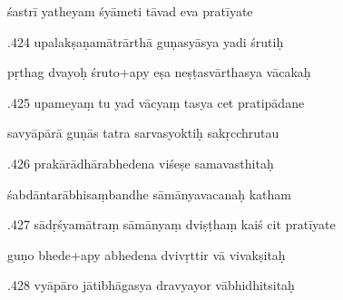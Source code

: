 \documentclass[article,12pt,a4paper]{memoir}%
\newcounter{parCount}
\begin{document}
	  
	  \pstart \leavevmode%
	śastrī yatheyam śyāmeti tāvad eva pratīyate 
	{}
	\pend%
      

	  
	  \pstart {}.424 upalakṣaṇamātrārthā guṇasyāsya yadi śrutiḥ 
	{}
	\pend%
      

	  
	  \pstart \leavevmode%
	pṛthag dvayoḥ śruto+apy eṣa neṣṭasvārthasya vācakaḥ 
	{}
	\pend%
      

	  
	  \pstart {}.425 upameyaṃ tu yad vācyaṃ tasya cet pratipādane 
	{}
	\pend%
      

	  
	  \pstart \leavevmode%
	savyāpārā guṇās tatra sarvasyoktiḥ sakṛcchrutau 
	{}
	\pend%
      

	  
	  \pstart {}.426 prakārādhārabhedena viśeṣe samavasthitaḥ 
	{}
	\pend%
      

	  
	  \pstart \leavevmode%
	śabdāntarābhisaṃbandhe sāmānyavacanaḥ katham 
	{}
	\pend%
      

	  
	  \pstart {}.427 sādṛśyamātraṃ sāmānyaṃ dviṣṭhaṃ kaiś cit pratīyate 
	{}
	\pend%
      

	  
	  \pstart \leavevmode%
	guṇo bhede+apy abhedena dvivṛttir vā vivakṣitaḥ 
	{}
	\pend%
      

	  
	  \pstart {}.428 vyāpāro jātibhāgasya dravyayor vābhidhitsitaḥ 
	{}
	\pend%
      
\end{document}
